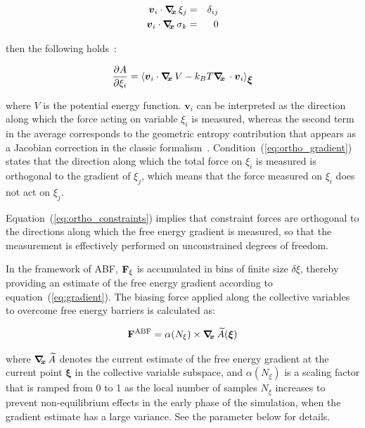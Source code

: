 \begin{eqnarray}
\label{eq:ortho_gradient}
{\mbox{\boldmath{$v$}}}_{i} \cdot \mbox{\boldmath$\nabla_{\!\!x}\,$} \xi_{j}    & = & \delta_{ij}\\
\label{eq:ortho_constraints}
{\mbox{\boldmath{$v$}}}_{i} \cdot \mbox{\boldmath$\nabla_{\!\!x}\,$} \sigma_{k} & = & 0
\end{eqnarray}

then the following holds~\cite{Ciccotti2005}:

\begin{equation}
\label{eq:gradient_vector}
\frac{\partial A}{\partial \xi_{i}} = \left\langle {\mbox{\boldmath{$v$}}}_{i} \cdot \mbox{\boldmath$\nabla_{\!\!x}\,$} V
- k_B T \mbox{\boldmath$\nabla_{\!\!x}\,$} \cdot {\mbox{\boldmath{$v$}}}_{i} \right\rangle_{{\mbox{\boldmath{$\xi$}}}}
\end{equation}

where $V$ is the potential energy function.
$\bm{v}_{i}$ can be interpreted as the direction along which the force
acting on variable $\xi_{i}$ is measured, whereas the second term in the
average corresponds to the geometric entropy contribution that appears
as a Jacobian correction in the classic formalism~\cite{Carter1989}.
Condition~(\ref{eq:ortho_gradient}) states that the direction along
which the total force on $\xi_{i}$ is measured is orthogonal to the
gradient of $\xi_{j}$, which means that the force measured on $\xi_{i}$
does not act on $\xi_{j}$.

Equation~(\ref{eq:ortho_constraints}) implies that constraint forces
are orthogonal to the directions along which the free energy gradient is
measured, so that the measurement is effectively performed on unconstrained
degrees of freedom.

In the framework of ABF,
${\bf F}_\xi$ is accumulated in bins of finite size $\delta \xi$,
thereby providing an estimate of the free energy gradient
according to equation~({\ref{eq:gradient}}).
The biasing force applied along the collective variables
to overcome free energy barriers is calculated as:

\begin{equation}
  \label{eq:abf}
  {\bf F}^{\rm ABF} = \alpha(N_\xi) \times \mbox{\boldmath$\nabla_{\!\!x}\,$} \widetilde A({\mbox{\boldmath{$\xi$}}})
\end{equation}

where $\mbox{\boldmath$\nabla_{\!\!x}\,$} \widetilde A$ denotes the current estimate of the
free energy gradient at the current point $\bm{\xi}$ in the collective
variable subspace, and $\alpha(N_\xi)$ is a scaling factor that is ramped
from 0 to 1 as the local number of samples $N_\xi$ increases
to prevent non-equilibrium effects in the early phase of the simulation,
when the gradient estimate has a large variance.
See the  parameter below for details.

